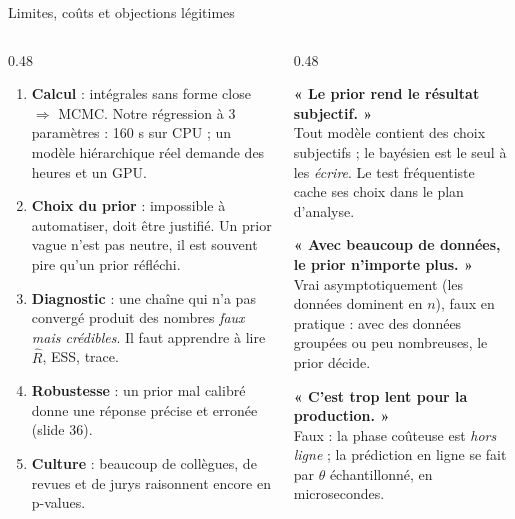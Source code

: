 \begin{frame}{Limites, coûts et objections légitimes}
\begin{columns}[t]
\begin{column}{0.48\textwidth}
\begin{wbox}
\begin{enumerate}
  \item \textbf{Calcul} : intégrales sans forme close $\Rightarrow$ MCMC.
        Notre régression à 3 paramètres : 160 s sur CPU ; un modèle hiérarchique
        réel demande des heures et un GPU.
  \item \textbf{Choix du prior} : impossible à automatiser, doit être justifié.
        Un prior vague n'est pas neutre, il est souvent pire qu'un prior réfléchi.
  \item \textbf{Diagnostic} : une chaîne qui n'a pas convergé produit des nombres
        \emph{faux mais crédibles}. Il faut apprendre à lire $\hat R$, ESS, trace.
  \item \textbf{Robustesse} : un prior mal calibré donne une réponse
        précise et erronée (slide 36).
  \item \textbf{Culture} : beaucoup de collègues, de revues et de jurys
        raisonnent encore en p-values.
\end{enumerate}
\end{wbox}
\end{column}
\begin{column}{0.48\textwidth}
\begin{kbox}
\textbf{« Le prior rend le résultat subjectif. »} \\
Tout modèle contient des choix subjectifs ; le bayésien est le seul à les
\emph{écrire}. Le test fréquentiste cache ses choix dans le plan d'analyse.

\vspace{1.5mm}
\textbf{« Avec beaucoup de données, le prior n'importe plus. »} \\
Vrai asymptotiquement (les données dominent en $n$), faux en pratique :
avec des données groupées ou peu nombreuses, le prior décide.

\vspace{1.5mm}
\textbf{« C'est trop lent pour la production. »} \\
Faux : la phase coûteuse est \emph{hors ligne} ; la prédiction en ligne
se fait par $\theta$ échantillonné, en microsecondes.
\end{kbox}
\end{column}
\end{columns}
\end{frame}

